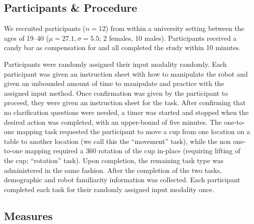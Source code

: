 \documentclass{sigchi}
\begin{document}

\subsection{Participants \& Procedure}

We recruited participants ($n=12$) from within a university setting between the ages of 19--40 ($\mu=27.1, \sigma=5.5$; 2 females, 10 males). Participants received a candy bar as compensation for and all completed the study within 10 minutes. 

Participants were randomly assigned their input modality randomly.  Each participant was given an instruction sheet with how to manipulate the robot and given an unbounded amount of time to manipulate and practice with the assigned input method.  Once confirmation was given by the participant to proceed, they were given an instruction sheet for the task.  After confirming that no clarification questions were needed, a timer was started and stopped when the desired action was completed, with an upper-bound of five minutes.  The one-to-one mapping task requested the participant to move a cup from one location on a table to another location (we call this the ``movement'' task), while the non one-to-one mapping required a 360 rotation of the cup in-place (requiring lifting of the cup; ``rotation'' task).  Upon completion, the remaining task type was administered in the same fashion.  After the completion of the two tasks, demographic and robot familiarity information was collected. Each participant completed each task for their randomly assigned input modality once. 

\subsection{Measures}
\end{document}
